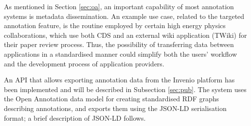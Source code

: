 
As mentioned in Section \ref{sec:oa}, an important capability of most
annotation systems is metadata dissemination. An example use case, related to
the targeted annotation feature, is the routine employed by certain high energy
physics collaborations, which use both CDS and an external wiki application
(TWiki) for their paper review process. Thus, the possibility of transferring
data between applications in a standardised manner could simplify both the
users' workflow and the development process of application providers.

An API that allows exporting annotation data from the Invenio platform has been
implemented and will be described in Subsection \ref{sec:pub}. The system uses
the Open Annotation data model for creating standardised RDF graphs describing
annotations, and exports them using the JSON-LD serialisation format; a brief
description of JSON-LD follows.
